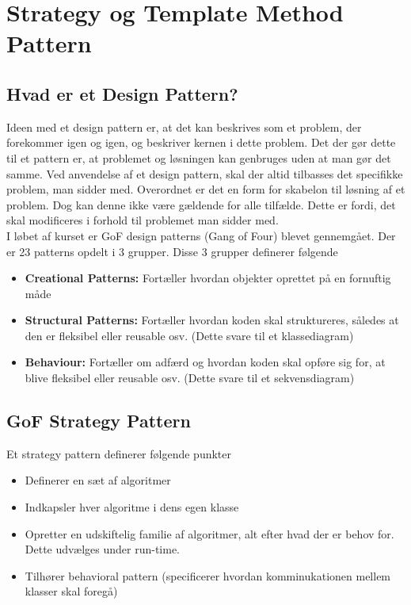 \documentclass[../SWD_disp.tex]{subfiles}
\begin{document}
\section{Strategy og Template Method Pattern}

\subsection*{Hvad er et Design Pattern?}
Ideen med et design pattern er, at det kan beskrives som et problem, der forekommer igen og igen, og beskriver kernen i dette problem. Det der gør dette til et pattern er, at problemet og løsningen kan genbruges uden at man gør det samme. Ved anvendelse af et design pattern, skal der altid tilbasses det specifikke problem, man sidder med. Overordnet er det en form for skabelon til løsning af et problem. Dog kan denne ikke være gældende for alle tilfælde. Dette er fordi, det skal modificeres i forhold til problemet man sidder med.
\\

I løbet af kurset er GoF design patterns (Gang of Four) blevet gennemgået. Der er 23 patterns opdelt i 3 grupper. Disse 3 grupper definerer følgende

\begin{itemize}
    \item \textbf{Creational Patterns:} Fortæller hvordan objekter oprettet på en fornuftig måde
    \item \textbf{Structural Patterns:} Fortæller hvordan koden skal struktureres, således at den er fleksibel eller reusable osv. (Dette svare til et klassediagram)
    \item \textbf{Behaviour:} Fortæller om adfærd og hvordan koden skal opføre sig for, at blive fleksibel eller reusable osv. (Dette svare til et sekvensdiagram)
\end{itemize}

\subsection*{GoF Strategy Pattern}
Et strategy pattern definerer følgende punkter

\begin{itemize}
    \item Definerer en sæt af algoritmer
    \item Indkapsler hver algoritme i dens egen klasse
    \item Opretter en udskiftelig familie af algoritmer, alt efter hvad der er behov for. Dette udvælges under run-time.
    \item Tilhører behavioral pattern (specificerer hvordan komminukationen mellem klasser skal foregå)
\end{itemize}
\end{document}
